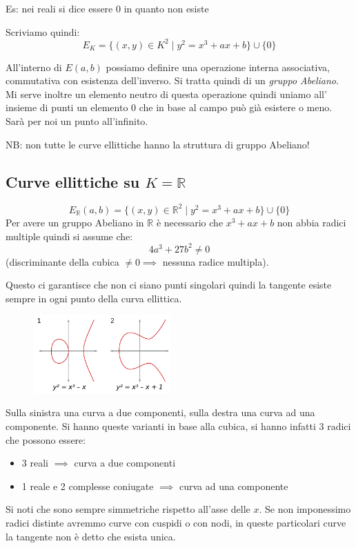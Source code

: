Es: nei reali si dice essere 0 in quanto non esiste

Scriviamo quindi:
$$ E_K = \{ (x,y) \in K^2 \mid y^2 = x^3 + ax +b \} \cup \{0\} $$

All'interno di $E(a,b)$ possiamo definire una operazione interna associativa, commutativa con esistenza dell'inverso.
Si tratta quindi di un \emph{gruppo Abeliano}.
Mi serve inoltre un elemento neutro di questa operazione quindi uniamo all' insieme di punti un elemento 0 che in base al campo può già esistere o meno.
Sarà per noi un punto all'infinito.

NB: non tutte le curve ellittiche hanno la struttura di gruppo Abeliano!

\subsection{Curve ellittiche su \texorpdfstring{$K=\mathbb{R}$}{K=R}}
$$ E_{\mathbb{R}}(a,b) = \{(x,y) \in \mathbb{R}^2 \mid y^2 = x^3 + ax +b \} \cup \{0\} $$
Per avere un gruppo Abeliano in $\mathbb{R}$ è necessario che $x^3 + ax + b$ non abbia radici multiple quindi si assume che:
$$ 4a^3 + 27b^2 \neq 0 $$
(discriminante della cubica $\neq 0 \implies $ nessuna radice multipla).

Questo ci garantisce che non ci siano punti singolari quindi la tangente esiste sempre in ogni punto della curva ellittica.

\begin{figure}[H]
    \centering
    \includegraphics[width=200px]{ECC_1.png}
\end{figure}

Sulla sinistra una curva a due componenti, sulla destra una curva ad una componente.
Si hanno queste varianti in base alla cubica, si hanno infatti 3 radici che possono essere:
\begin{itemize}
    \item 3 reali $\implies$ curva a due componenti
    \item 1 reale e 2 complesse coniugate $\implies$ curva ad una componente
\end{itemize}

Si noti che sono sempre simmetriche rispetto all'asse delle $x$.
Se non imponessimo radici distinte avremmo curve con cuspidi o con nodi, in queste particolari curve la tangente non è detto che esista unica.

